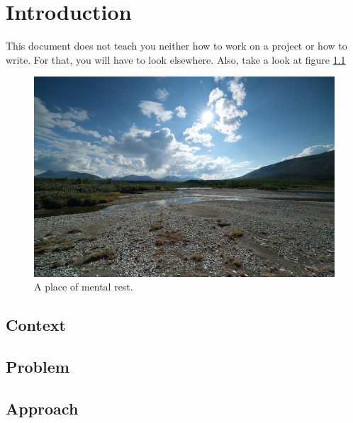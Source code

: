 \chapter{Introduction}

This document does not teach you neither how to work on a project or how to write. For that, you will have to look elsewhere\cite{reportwriting}. Also, take a look at figure \ref{fig:intro:rest}

\begin{figure}[tbp]
  \includegraphics[width=\linewidth]{material/src/dscf7542.png}
  \caption{A place of mental rest.}
  \label{fig:intro:rest}
\end{figure}

\section{Context}
\section{Problem}
\section{Approach}

